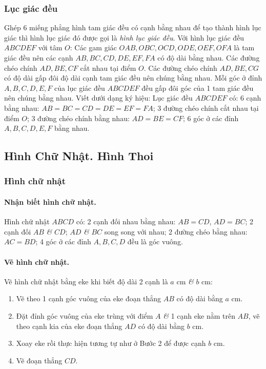 \documentclass{article}
\numberwithin{equation}{section}
\begin{document}
\subsubsection{Lục giác đều}
Ghép 6 miếng phẳng hình tam giác đều có cạnh bằng nhau để tạo thành hình lục giác thì hình lục giác đó được gọi là \emph{hình lục giác đều}. Với hình lục giác đều $ABCDEF$ với tâm $O$: Các gam giác $OAB,OBC,OCD,ODE,OEF,OFA$ là tam giác đều nên các cạnh $AB,BC,CD,DE,EF,FA$ có độ dài bằng nhau. Các đường chéo chính $AD,BE,CF$ cắt nhau tại điểm $O$. Các đường chéo chính $AD,BE,CG$ có độ dài gấp đôi độ dài cạnh tam giác đều nên chúng bằng nhau. Mỗi góc ở đỉnh $A,B,C,D,E,F$ của lục giác đều $ABCDEF$ đều gấp đôi góc của 1 tam giác đều nên chúng bằng nhau. Viết dưới dạng ký hiệu: Lục giác đều $ABCDEF$ có: 6 cạnh bằng nhau: $AB = BC = CD = DE = EF = FA$; 3 đường chéo chính cắt nhau tại điểm $O$; 3 đường chéo chính bằng nhau: $AD = BE = CF$; 6 góc ở các đỉnh $A,B,C,D,E,F$ bằng nhau.


\subsection{Hình Chữ Nhật. Hình Thoi}

\subsubsection{Hình chữ nhật}

\paragraph{Nhận biết hình chữ nhật.} Hình chữ nhật $ABCD$ có: 2 cạnh đối nhau bằng nhau: $AB = CD$, $AD = BC$; 2 cạnh đối $AB$ \textit{\&} $CD$; $AD$ \textit{\&} $BC$ song song với nhau; 2 đường chéo bằng nhau: $AC = BD$; 4 góc ở các đỉnh $A,B,C,D$ đều là góc vuông.

\paragraph{Vẽ hình chữ nhật.} Vẽ hình chữ nhật bằng eke khi biết độ dài 2 cạnh là $a$ cm \textit{\&} $b$ cm:
\begin{enumerate}
	\item Vẽ theo 1 cạnh góc vuông của eke đoạn thẳng $AB$ có độ dài bằng $a$ cm.
	\item Đặt đỉnh góc vuông của eke trùng với điểm $A$ \textit{\&} 1 cạnh eke nằm trên $AB$, vẽ theo cạnh kia của eke đoạn thẳng $AD$ có độ dài bằng $b$ cm.
	\item Xoay eke rồi thực hiện tương tự như ở Bước 2 để được cạnh $b$ cm.
	\item Vẽ đoạn thẳng $CD$.
\end{enumerate}
\end{document}
